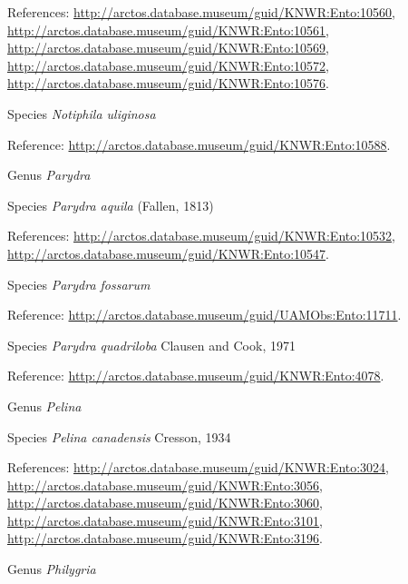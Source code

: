 \documentclass[9pt, article]{memoir}
\begin{document}
\begin{multicols}{2}
References: 
\url{http://arctos.database.museum/guid/KNWR:Ento:10560}, 
\url{http://arctos.database.museum/guid/KNWR:Ento:10561}, 
\url{http://arctos.database.museum/guid/KNWR:Ento:10569}, 
\url{http://arctos.database.museum/guid/KNWR:Ento:10572}, 
\url{http://arctos.database.museum/guid/KNWR:Ento:10576}.

\vspace{6pt}\noindent\hspace{36pt}Species \textit{Notiphila uliginosa}


Reference: 
\url{http://arctos.database.museum/guid/KNWR:Ento:10588}.

\vspace{6pt}\noindent\hspace{30pt}Genus \textit{Parydra}


\vspace{6pt}\noindent\hspace{36pt}Species \textit{Parydra aquila} (Fallen, 1813)


References: 
\url{http://arctos.database.museum/guid/KNWR:Ento:10532}, 
\url{http://arctos.database.museum/guid/KNWR:Ento:10547}.

\vspace{6pt}\noindent\hspace{36pt}Species \textit{Parydra fossarum}


Reference: 
\url{http://arctos.database.museum/guid/UAMObs:Ento:11711}.

\vspace{6pt}\noindent\hspace{36pt}Species \textit{Parydra quadriloba} Clausen and Cook, 1971


Reference: 
\url{http://arctos.database.museum/guid/KNWR:Ento:4078}.

\vspace{6pt}\noindent\hspace{30pt}Genus \textit{Pelina}


\vspace{6pt}\noindent\hspace{36pt}Species \textit{Pelina canadensis} Cresson, 1934


References: 
\url{http://arctos.database.museum/guid/KNWR:Ento:3024}, 
\url{http://arctos.database.museum/guid/KNWR:Ento:3056}, 
\url{http://arctos.database.museum/guid/KNWR:Ento:3060}, 
\url{http://arctos.database.museum/guid/KNWR:Ento:3101}, 
\url{http://arctos.database.museum/guid/KNWR:Ento:3196}.

\vspace{6pt}\noindent\hspace{30pt}Genus \textit{Philygria}



\end{multicols}
\end{document}
